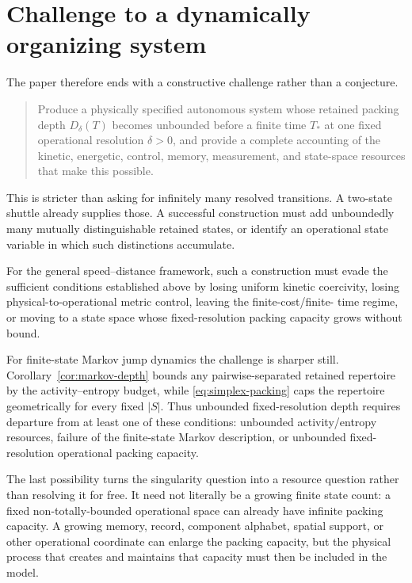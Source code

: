 \documentclass[11pt,a4paper]{article}
\theoremstyle{definition}
\numberwithin{equation}{section}
\begin{document}
\section{Challenge to a dynamically organizing system}

The paper therefore ends with a constructive challenge rather than a
conjecture.

\begin{quote}
Produce a physically specified autonomous system whose retained packing depth
$D_\delta(T)$ becomes unbounded before a finite time $T_*$ at one fixed
operational resolution $\delta>0$, and provide a complete accounting of the
kinetic, energetic, control, memory, measurement, and state-space resources
that make this possible.
\end{quote}

This is stricter than asking for infinitely many resolved transitions. A
two-state shuttle already supplies those. A successful construction must add
unboundedly many mutually distinguishable retained states, or identify an
operational state variable in which such distinctions accumulate.

For the general speed--distance framework, such a construction must evade the
sufficient conditions established above by losing uniform kinetic coercivity,
losing physical-to-operational metric control, leaving the finite-cost/finite-
time regime, or moving to a state space whose fixed-resolution packing
capacity grows without bound.

For finite-state Markov jump dynamics the challenge is sharper still.
Corollary~\ref{cor:markov-depth} bounds any pairwise-separated retained
repertoire by the activity--entropy budget, while
\eqref{eq:simplex-packing} caps the repertoire geometrically for every fixed
$|S|$. Thus unbounded fixed-resolution depth requires departure from at least
one of these conditions: unbounded activity/entropy resources, failure of the
finite-state Markov description, or unbounded fixed-resolution operational packing capacity.

The last possibility turns the singularity question into a resource question
rather than resolving it for free. It need not literally be a growing finite
state count: a fixed non-totally-bounded operational space can already have
infinite packing capacity. A growing memory, record, component alphabet,
spatial support, or other operational coordinate can enlarge the packing
capacity, but the physical process that creates and maintains that capacity
must then be included in the model.
\end{document}
